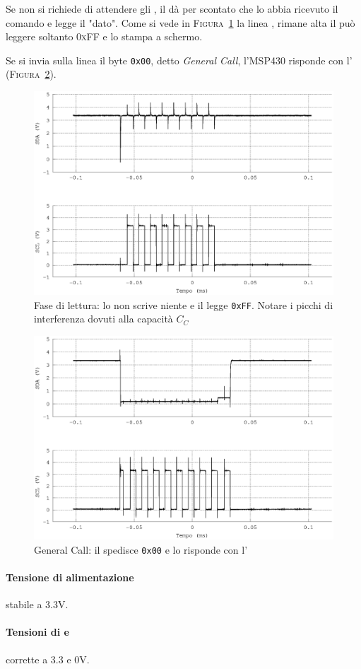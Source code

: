 Se non si richiede di attendere gli {\ack},
il \master{} dà per scontato che lo \slave{} abbia ricevuto il comando
e legge il "dato". Come si vede in \textsc{Figura~\ref{fig:i2c_lettura}}
la linea \sda{}, rimane alta il \master{} può leggere soltanto \textsc{0xFF}
e lo stampa a schermo.

Se si invia sulla linea il byte \texttt{0x00}, detto \textit{General Call},
 l'{MSP430} risponde con l'{\ack}
 (\textsc{Figura~\ref{fig:i2c_generalcall}}).

\begin{figure}
\centering
  \includegraphics[width=.5\textwidth]{LetturaNero}
	\caption{Fase di lettura: lo \slave{} non scrive niente e il \master{} legge \texttt{0xFF}. Notare i picchi di interferenza dovuti alla capacità $C_C$}
    \label{fig:i2c_lettura}
\end{figure}

\begin{figure}
\centering
  \includegraphics[width=.5\textwidth]{GeneralCallNero}
	\caption{General Call: il \master{} spedisce \texttt{0x00} e lo \slave{} risponde con l'\Ack{}}
    \label{fig:i2c_generalcall}
\end{figure}

\paragraph{Tensione di alimentazione}
	stabile a 3.3V.
    
\paragraph{Tensioni di {\sda} e {\scl}}
	corrette a 3.3 e 0V.

